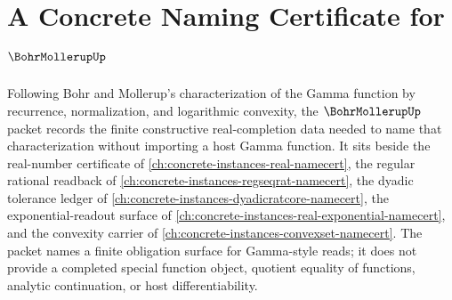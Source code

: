 \chapter{A Concrete Naming Certificate for $\BohrMollerupUp$}
\label{ch:concrete-instances-bohr-mollerup-namecert}

Following Bohr and Mollerup's characterization of the Gamma function by recurrence, normalization, and logarithmic convexity, the $\BohrMollerupUp$ packet records the finite constructive real-completion data needed to name that characterization without importing a host Gamma function. It sits beside the real-number certificate of \autoref{ch:concrete-instances-real-namecert}, the regular rational readback of \autoref{ch:concrete-instances-regseqrat-namecert}, the dyadic tolerance ledger of \autoref{ch:concrete-instances-dyadicratcore-namecert}, the exponential-readout surface of \autoref{ch:concrete-instances-real-exponential-namecert}, and the convexity carrier of \autoref{ch:concrete-instances-convexset-namecert}. The packet names a finite obligation surface for Gamma-style reads; it does not provide a completed special function object, quotient equality of functions, analytic continuation, or host differentiability.

